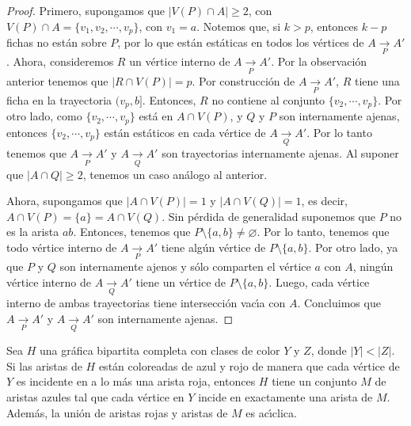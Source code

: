 \begin{proof}
    Primero, supongamos que $|V(P) \cap A| \geq 2$, con $V(P) \cap A = \{v_{1},
    v_{2}, \cdots , v_{p}\}$, con $v_{1} = a$. Notemos que, si $k > p$, entonces
    $k-p$ fichas no est\'an sobre $P$, por lo que est\'an est\'aticas en todos
    los v\'ertices de $A \xrightarrow[P]{} A'$. Ahora, consideremos $R$ un
    v\'ertice interno de $A \xrightarrow[P]{} A'$. Por la observaci\'on anterior
    tenemos que  $|R \cap V(P)| = p$. Por construcci\'on de $A \xrightarrow[P]{}
    A'$, $R$ tiene una ficha en la trayectoria $(v_{p},b ]$. Entonces, $R$ no
    contiene al conjunto $\{v_{2}, \cdots, v_{p}\}$. Por otro lado, como
    $\{v_{2}, \cdots, v_{p}\}$ est\'a en $A \cap V(P)$, y $Q$ y $P$ son
    internamente ajenas, entonces $\{v_{2}, \cdots, v_{p}\}$ est\'an est\'aticos
    en cada v\'ertice de $A \xrightarrow[Q]{} A'$. Por lo tanto tenemos que $A
    \xrightarrow[P]{} A'$ y $A \xrightarrow[Q]{}A'$ son trayectorias
    internamente ajenas. Al suponer que $|A \cap Q| \geq 2$, tenemos un caso
    an\'alogo al anterior.

    Ahora, supongamos que $|A \cap V(P)| = 1$ y $|A \cap V(Q)| = 1$, es decir,
    $A \cap V(P) = \{a\} = A \cap V(Q)$. Sin p\'erdida de generalidad suponemos
    que $P$ no es la arista $ab$. Entonces, tenemos que $P \setminus \{a,b\}
    \neq \varnothing$. Por lo tanto, tenemos que todo v\'ertice interno de $A
    \xrightarrow[P]{} A'$ tiene alg\'un v\'ertice de $P \setminus \{a, b\}$. Por
    otro lado, ya que $P$ y $Q$ son internamente ajenos y s\'olo comparten el
    v\'ertice $a$ con $A$, ning\'un v\'ertice interno de $A \xrightarrow[Q]{}
    A'$ tiene un v\'ertice de $P \setminus \{a, b\}$. Luego, cada v\'ertice
    interno de ambas trayectorias tiene intersecci\'on vac\'\i{}a con $A$.
    Concluimos que $A \xrightarrow[P]{} A'$ y $A \xrightarrow[Q]{} A'$ son
    internamente ajenas.
\end{proof}

\begin{lema}%
\label{lem:rb-bipGraph}
    Sea $H$ una gr\'afica bipartita completa con clases de color $Y$ y $Z$,
    donde $|Y|<|Z|$. Si las aristas de $H$ est\'an coloreadas de azul y rojo de
    manera que cada v\'ertice de $Y$ es incidente en a lo m\'as una arista roja,
    entonces $H$ tiene un conjunto $M$ de aristas azules tal que cada v\'ertice
    en $Y$ incide en exactamente una arista de $M$. Adem\'as, la uni\'on de
    aristas rojas y aristas de $M$ es ac\'\i{}clica.
\end{lema}


